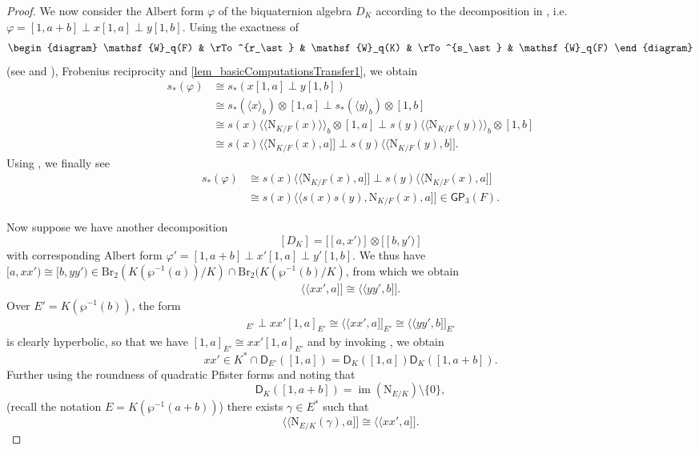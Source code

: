 \documentclass{amsart}
\numberwithin{equation}{section}
\newcommand{\im}{\operatorname{im}}
\newcommand{\qpf}[1]{\langle\!\langle #1]\!]}
\newcommand{\bif}[1]{\langle #1 \rangle_b}
\newcommand{\bipf}[1]{\langle\!\langle #1\rangle\!\rangle_b}
\newcommand{\BrTwo}{\mathrm{Br}_2}
\newcommand{\quat}[1]{[#1)}
\newcommand{\norm}{\mathrm{N}}
\newcommand{\W}{\mathsf{W}}
\newcommand{\GP}{\mathsf{GP}}
\newcommand{\D}{\mathsf{D}}
\begin{document}
\begin{proof}
    We now consider the Albert form $\varphi$ of the biquaternion algebra $D_K$ according to the decomposition in , i.e. $\varphi = [1, a+b] \perp x[1, a] \perp y[1, b]$.
    Using the exactness of 
    \[\begin{diagram}
        \W_q(F) & \rTo^{r_\ast} & \W_q(K) & \rTo^{s_\ast} & \W_q(F)
    \end{diagram}\]
    (see \cite[Theorem 34.9]{ElmanKarpenkoMerkurjev2008} and ), Frobenius reciprocity and  \ref{lem_basicComputationsTransfer1}, we obtain
    \begin{align*}
        s_\ast(\varphi) &\cong s_\ast(x[1, a] \perp y[1, b]) \\
        &\cong s_\ast(\bif{x}) \otimes [1, a] \perp s_\ast(\bif y) \otimes [1, b]\\
        &\cong s(x)\bipf{\norm_{K/F}(x)} \otimes [1, a] \perp s(y) \bipf{\norm_{K/F}(y)} \otimes [1, b] \\
        &\cong s(x) \qpf{\norm_{K/F}(x), a} \perp s(y) \qpf{\norm_{K/F}(y), b}.
    \end{align*}
    Using , we finally see
    \begin{align}\label{eq_TrVarphiInI3}
        s_\ast(\varphi) &\cong s(x) \qpf{\norm_{K/F}(x), a} \perp s(y) \qpf{\norm_{K/F}(x), a} \nonumber \\
        &\cong s(x) \qpf{s(x)s(y), \norm_{K/F}(x), a} \in \GP_3(F).
    \end{align}

    Now suppose we have another decomposition 
    \[[D_K] = [\quat{a, x'}] \otimes [\quat{b, y'}]\]
    with corresponding Albert form $\varphi' = [1, a+b] \perp x'[1, a] \perp y'[1, b]$.
    We thus have $\quat{a, xx'} \cong \quat{b, yy'} \in \BrTwo(K(\wp^{-1}(a))/K) \cap \BrTwo(K(\wp^{-1}(b) / K)$, from which we obtain
    \begin{align*}
        \qpf{xx', a} \cong \qpf{yy', b}.
    \end{align*}
    Over $E' = K(\wp^{-1}(b))$, the form 
    \begin{align*}
        [1, a]_{E'} \perp xx'[1, a]_{E'} \cong \qpf{xx', a}_{E'} \cong \qpf{yy', b}_{E'}
    \end{align*}
    is clearly hyperbolic, so that we have $[1, a]_{E'} \cong xx'[1, a]_{E'}$ and by invoking \cite[Lemma 5.3]{ChapmanLaghribiMukhija_I3H3SymbolLength}, we obtain 
    \[xx' \in K^\ast \cap \D_{E'}([1, a]) = \D_K([1, a])\D_K([1, a + b]).\]
    Further using the roundness of quadratic Pfister forms and noting that 
    \[\D_K([1, a + b]) = \im(\norm_{E/K}) \setminus \{0\},\] 
    (recall the notation $E = K(\wp^{-1}(a + b))$) there exists $\gamma \in E^\ast$ such that 
    \[\qpf{\norm_{E / K}(\gamma), a} \cong \qpf{xx', a}.\]


\end{proof}
\end{document}
